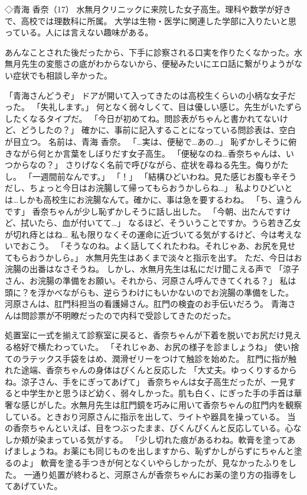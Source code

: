 ◇青海 香奈（17）
水無月クリニックに来院した女子高生。理科や数学が好きで、高校では理数科に所属。
大学は生物・医学に関連した学部に入りたいと思っている。人には言えない趣味がある。

あんなことされた後だったから、下手に診察される口実を作りたくなかった。水無月先生の変態さの底がわからないから、便秘みたいにエロ話に繋がりようがない症状でも相談し辛かった。

「青海さんどうぞ」
ドアが開いて入ってきたのは高校生くらいの小柄な女子だった。
「失礼します。」
何となく弱々しくて、目は優しい感じ。先生がいたずらしたくなるタイプだ。
「今日が初めてね。問診表がちゃんと書かれてないけど、どうしたの？」
確かに、事前に記入することになっている問診表は、空白が目立つ。
名前は、青海 香奈。
「…実は、便秘で…あの…」
恥ずかしそうに俯きながら何とか言葉をしぼりだす女子高生。
「便秘なのね…香奈ちゃんは、いつからなの？」
さりげなく名前で呼びながら、症状を尋ねる先生。侮りがたし。
「一週間前なんです。」
「！」
「結構ひどいわね。見た感じお腹も辛そうだし、ちょっと今日はお浣腸して帰ってもらおうかしらね…」
私よりひどいとは…しかも高校生にお浣腸なんて。確かに、事は急を要するわね。
「ち、違うんです」
香奈ちゃんが少し恥ずかしそうに話し出した。
「今朝、出たんですけど、拭いたら、血が付いてて…」
なるほど、そういうことですか。うら若き乙女が切れ痔とはね…
私も限りなくその運命に近づいてる気がするけど、今は考えないでおこう。
「そうなのね。よく話してくれたわね。それじゃあ、お尻を見せてもらおうかしら。」
水無月先生はあくまで淡々と指示を出す。
ただ、今日はお浣腸の出番はなさそうね。
しかし、水無月先生は私にだけ聞こえる声で
「涼子さん、お浣腸の準備をお願い。それから、河原さん呼んできてくれる？」
私は頭に？を浮かべながらも、逆らうわけにもいかないのでお浣腸の準備をした。
河原さんは、肛門科担当の看護婦さん。肛門の検査のお手伝いだろう。
青海さんは問診票が不明瞭だったので内科で受診してきたのだった。

処置室に一式を揃えて診察室に戻ると、香奈ちゃんが下着を脱いでお尻だけ見える格好で横たわっていた。
「それじゃあ、お尻の様子を診ましょうね」
使い捨てのラテックス手袋をはめ、潤滑ゼリーをつけて触診を始めた。
肛門に指が触れた途端、香奈ちゃんの身体はぴくんと反応した
「大丈夫。ゆっくりするからね。涼子さん、手をにぎってあげて」
香奈ちゃんは女子高生だったが、一見すると中学生かと思うほど幼く、弱々しかった。肌も白く、にぎった手の手首は華奢な感じがした。水無月先生は肛門鏡を巧みに用いて香奈ちゃんの肛門内を観察している。ときおり河原さんに指示を出して、ライトや器具を操っている。
当の香奈ちゃんといえば、目をつぶったまま、ぴくんぴくんと反応している。心なしか頬が染まっている気がする。
「少し切れた痕があるわね。軟膏を塗ってあげましょうね。お薬にも同じものを出しますから、恥ずかしがらずにちゃんと塗るのよ」
軟膏を塗る手つきが何となくいやらしかったが、見なかったふりをした。
一通り処置が終わると、河原さんが香奈ちゃんにお薬の塗り方の指導をしてあげていた。

